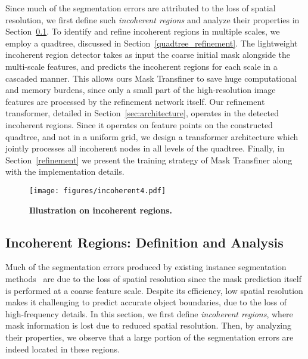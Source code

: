 \documentclass[10pt,twocolumn,letterpaper]{article}
\begin{document}
Since much of the segmentation errors are attributed to the loss of spatial resolution, we first define such \emph{incoherent regions} and analyze their properties in Section~\ref{sec:incoherent}. To identify and refine incoherent regions in multiple scales, we employ a quadtree, discussed in Section~\ref{quadtree_refinement}. The lightweight incoherent region detector takes as input the coarse initial mask alongside the multi-scale features, and predicts the incoherent regions for each scale in a cascaded manner. This allows ours Mask Transfiner to save huge computational and memory burdens, since only a small part of the high-resolution image features are processed by the refinement network itself.
Our refinement transformer, detailed in Section~\ref{sec:architecture}, operates in the detected incoherent regions. Since it operates on feature points on the constructed quadtree, and not in a uniform grid, we design a transformer architecture which jointly processes all incoherent nodes in all levels of the quadtree. 
Finally, in Section~\ref{refinement} we present the training strategy of Mask Transfiner along with the implementation details.





\begin{figure}[!h]
	\centering
\texttt{[image: figures/incoherent4.pdf]}
	\caption{\textbf{Illustration on incoherent regions.}}
\label{fig:incoherent}
	\vspace{-0.2in}
\end{figure}

\subsection{Incoherent Regions: Definition and Analysis}
\label{sec:incoherent}
Much of the segmentation errors produced by existing instance segmentation methods~\cite{he2017mask,dong2021solq} are due to the loss of spatial resolution since the mask prediction itself is performed at a coarse feature scale.
Despite its efficiency, low spatial resolution makes it challenging to predict accurate object boundaries, due to the loss of high-frequency details. In this section, we first define \emph{incoherent regions}, where mask information is lost due to reduced spatial resolution. Then, by analyzing their properties, we observe that a large portion of the segmentation errors are indeed located in these regions. 
\end{document}
